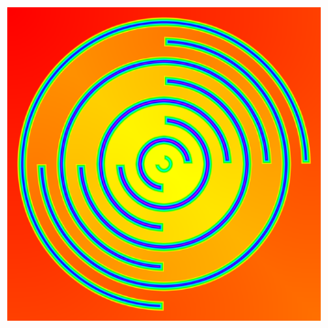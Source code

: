 \documentclass[11pt]{article}       %
\begin{document}
\begin{figure}
\begin{subfigure}[b]{.3\columnwidth}
	\end{subfigure}
	\begin{subfigure}[b]{.3\columnwidth}
		\includegraphics[width=\textwidth]{Figures/ghcm_systolic_7_rings_permeable}
	\end{subfigure}
	

\end{figure}
\end{document}
